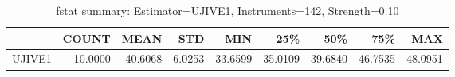 \begin{table}[ht]
\centering
\caption{fstat summary: Estimator=UJIVE1, Instruments=142, Strength=0.10}
\begin{tabular}{lrrrrrrrr}
\toprule
 & COUNT & MEAN & STD & MIN & 25\% & 50\% & 75\% & MAX \\
\midrule
UJIVE1 & 10.0000 & 40.6068 & 6.0253 & 33.6599 & 35.0109 & 39.6840 & 46.7535 & 48.0951 \\
\bottomrule
\end{tabular}
\end{table}
